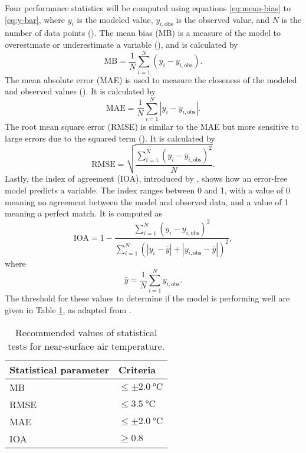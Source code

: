 	Four performance statistics will be computed using equations \ref{eq:mean-bias} to \ref{eq:y-bar},
		where $y_i$ is the modeled value, $y_{i,\text{obs}}$ is the observed value, and $N$ is the number of data points (\cite{Bilang2022}).
	The mean bias (MB) is a measure of the model to overestimate or underestimate a variable (\cite{Carbonell2013}), and is calculated by
	\begin{equation}
		\text{MB} =
			\frac{1}{N}
			\sum_{i=1}^{N}
			(y_i - y_{i,\text{obs}}).
			\label{eq:mean-bias}
	\end{equation}
	The mean absolute error (MAE) is used to measure the closeness of the modeled and observed values (\cite{Arasa2016}).
	It is calculated by
	\begin{equation}
		\text{MAE} =
			\frac{1}{N}
			\sum_{i=1}^{N} 
			|y_i - y_{i,\text{obs}}|. \label{eq:mean-absolute-error}
	\end{equation}
	The root mean square error (RMSE) is similar to the MAE but more sensitive to large errors due to the squared term (\cite{Carbonell2013}).
	It is calculated by
	\begin{equation}
		\text{RMSE} =
		\sqrt{
			\frac{
				\sum_{i=1}^{N}
				(y_i - y_{i,\text{obs}}) ^ 2
			}{N}
		}.
		\label{eq:root-mean-square-error}
	\end{equation}
	Lastly, the index of agreement (IOA), introduced by \textcite{Willmott1980}, shows how an error-free model predicts a variable.
	The index ranges between \num{0} and \num{1},
		with a value of \num{0} meaning no agreement between the model and observed data,
		and a value of \num{1} meaning a perfect match. 
	It is computed as
	\begin{equation}
		\text{IOA} =
			1 - 
			\frac{
				\sum_{i=1}^{N}
				(y_i - y_{i,\text{obs}}) ^ 2
			}{
				\sum_{i=1}^{N} (
					|y_i - \bar{y}| +
					|y_{i,\text{obs}} - \bar{y}|
				)^2
			},
			\label{eq:index-of-agreement}
	\end{equation}
	where
	\begin{equation}
		\bar{y} = 
			\frac{1}{N}
			\sum_{i=1}^{N} y_{i,\text{obs}}.
			\label{eq:y-bar}
	\end{equation}
	The threshold for these values to determine if the model is performing well are given in Table \ref{tab:performance-statistics-threshold}, as adapted from \textcite{Bilang2022}.

	\begin{table}	
		\caption{Recommended values of statistical tests for near-surface air temperature.}
		\label{tab:performance-statistics-threshold}
		\centering
		\begin{tabular}{l l}
			\hline \hline
			Statistical parameter & Criteria\\
			\hline
			MB & $\leq \pm \qty{2.0}{\degreeCelsius}$ \\
			RMSE & $\leq \qty{3.5}{\degreeCelsius}$\\
			MAE & $\leq \pm \qty{2.0}{\degreeCelsius}$\\
			IOA	& $\geq \num{0.8}$\\
			\hline
		\end{tabular}		
	\end{table}

